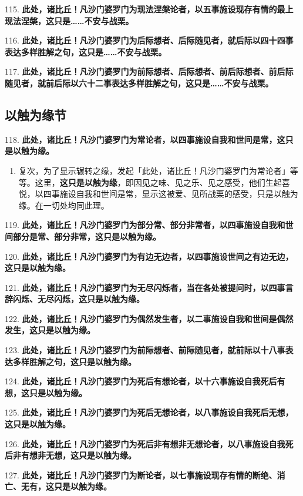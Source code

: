 {\Large 115.} \textbf{此处，诸比丘！凡沙门婆罗门为现法涅槃论者，以五事施设现存有情的最上现法涅槃，这只是……不安与战栗。}

{\Large 116.} \textbf{此处，诸比丘！凡沙门婆罗门为后际想者、后际随见者，就后际以四十四事表达多样胜解之句，这只是……不安与战栗。}

{\Large 117.} \textbf{此处，诸比丘！凡沙门婆罗门为前际想者、后际想者、前后际想者、前后际随见者，就前后际以六十二事表达多样胜解之句，这只是……不安与战栗。}

\subsection{以触为缘节}

{\Large 118.} \textbf{此处，诸比丘！凡沙门婆罗门为常论者，以四事施设自我和世间是常，这只是以触为缘。}

\begin{enumerate}\item 复次，为了显示辗转之缘，发起「此处，诸比丘！凡沙门婆罗门为常论者」等等。这里，\textbf{这只是以触为缘}，即因见之味、见之乐、见之感受，他们生起喜悦，以四事施设自我和世间是常，显示这被爱、见所战栗的感受，只是以触为缘。在一切处均同此理。\end{enumerate}

{\Large 119.} \textbf{此处，诸比丘！凡沙门婆罗门为部分常、部分非常者，以四事施设自我和世间部分是常、部分非常，这只是以触为缘。}

{\Large 120.} \textbf{此处，诸比丘！凡沙门婆罗门为有边无边者，以四事施设世间之有边无边，这只是以触为缘。}

{\Large 121.} \textbf{此处，诸比丘！凡沙门婆罗门为无尽闪烁者，当在各处被提问时，以四事言辞闪烁、无尽闪烁，这只是以触为缘。}

{\Large 122.} \textbf{此处，诸比丘！凡沙门婆罗门为偶然发生者，以二事施设自我和世间是偶然发生，这只是以触为缘。}

{\Large 123.} \textbf{此处，诸比丘！凡沙门婆罗门为前际想者、前际随见者，就前际以十八事表达多样胜解之句，这只是以触为缘。}

{\Large 124.} \textbf{此处，诸比丘！凡沙门婆罗门为死后有想论者，以十六事施设自我死后有想，这只是以触为缘。}

{\Large 125.} \textbf{此处，诸比丘！凡沙门婆罗门为死后无想论者，以八事施设自我死后无想，这只是以触为缘。}

{\Large 126.} \textbf{此处，诸比丘！凡沙门婆罗门为死后非有想非无想论者，以八事施设自我死后非有想非无想，这只是以触为缘。}

{\Large 127.} \textbf{此处，诸比丘！凡沙门婆罗门为断论者，以七事施设现存有情的断绝、消亡、无有，这只是以触为缘。}

